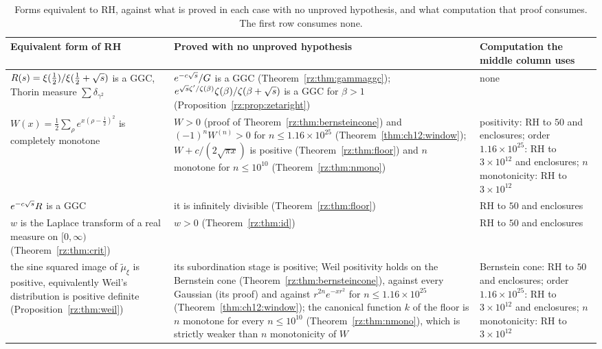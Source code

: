 \begin{table}[htbp]
\centering
\small
\begin{tabular}{p{}p{}p{}}
\toprule
Equivalent form of RH & Proved with no unproved hypothesis & Computation the middle column uses\\
\midrule
$R(s)=\xi(\frac12)/\xi(\frac12+\sqrt{s})$ is a GGC, Thorin measure $\sum\delta_{\gamma^2}$ \cite[Proposition~3.2]{P17} & $e^{-c\sqrt{s}}/G$ is a GGC (Theorem~\ref{rz:thm:gammaggc}); $e^{\sqrt{s}\zeta'/\zeta(\beta)}\zeta(\beta)/\zeta(\beta+\sqrt{s})$ is a GGC for $\beta>1$ (Proposition~\ref{rz:prop:zetaright}) & none\\
$W(x)=\frac12\sum_\rho e^{x(\rho-\frac12)^2}$ is completely monotone & $W>0$ (proof of Theorem~\ref{rz:thm:bernsteincone}) and $(-1)^nW^{(n)}>0$ for $n\le1.16\times10^{25}$ (Theorem~\ref{thm:ch12:window}); $W+c/(2\sqrt{\pi x})$ is positive (Theorem~\ref{rz:thm:floor}) and $n$ monotone for $n\le10^{10}$ (Theorem~\ref{rz:thm:nmono}) & positivity: RH to $50$ and enclosures; order $1.16\times10^{25}$: RH to $3\times10^{12}$ and enclosures; $n$ monotonicity: RH to $3\times10^{12}$\\
$e^{-c\sqrt{s}}R$ is a GGC & it is infinitely divisible (Theorem~\ref{rz:thm:floor}) & RH to $50$ and enclosures\\
$w$ is the Laplace transform of a real measure on $[0,\infty)$ (Theorem~\ref{rz:thm:crit}) & $w>0$ (Theorem~\ref{rz:thm:id}) & RH to $50$ and enclosures\\
the sine squared image of $\tilde\mu_\xi$ is positive, equivalently Weil's distribution is positive definite (Proposition~\ref{rz:thm:weil}) & its subordination stage is positive; Weil positivity holds on the Bernstein cone (Theorem~\ref{rz:thm:bernsteincone}), against every Gaussian (its proof) and against $r^{2n}e^{-xr^2}$ for $n\le1.16\times10^{25}$ (Theorem~\ref{thm:ch12:window}); the canonical function $k$ of the floor is $n$ monotone for every $n\le10^{10}$ (Theorem~\ref{rz:thm:nmono}), which is strictly weaker than $n$ monotonicity of $W$ & Bernstein cone: RH to $50$ and enclosures; order $1.16\times10^{25}$: RH to $3\times10^{12}$ and enclosures; $n$ monotonicity: RH to $3\times10^{12}$\\
\bottomrule
\end{tabular}
\caption{Forms equivalent to RH, against what is proved in each case with no unproved hypothesis, and what computation that proof consumes. The first row consumes none.}
\label{rz:tab:reductions}
\end{table}

